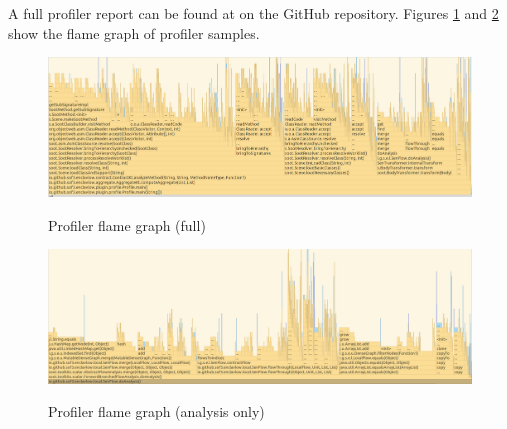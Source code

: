 A full profiler report can be found at  on the GitHub repository.
Figures \ref{fig:flame-graph-full} and \ref{fig:flame-graph-analysis}
show the flame graph of profiler samples.

\begin{figure}
  \caption{Profiler flame graph (full)}
  \includegraphics[scale=0.33]{screenshot20201231183130.png}
  \label{fig:flame-graph-full}
\end{figure}

\begin{figure}
  \caption{Profiler flame graph (analysis only)}
  \includegraphics[scale=0.3]{screenshot20201231183716.png}
  \label{fig:flame-graph-analysis}
\end{figure}
